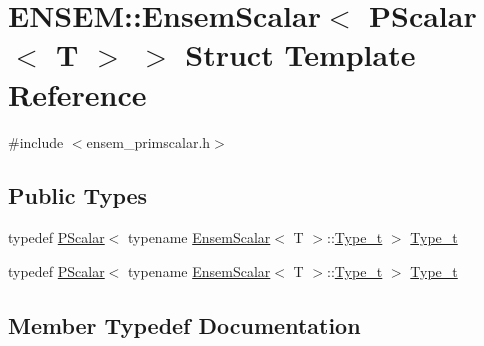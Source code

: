 \hypertarget{structENSEM_1_1EnsemScalar_3_01PScalar_3_01T_01_4_01_4}{}\section{E\+N\+S\+EM\+:\+:Ensem\+Scalar$<$ P\+Scalar$<$ T $>$ $>$ Struct Template Reference}
\label{structENSEM_1_1EnsemScalar_3_01PScalar_3_01T_01_4_01_4}


{\ttfamily \#include $<$ensem\+\_\+primscalar.\+h$>$}

\subsection*{Public Types}
\begin{DoxyCompactItemize}
\item 
typedef \mbox{\hyperlink{classENSEM_1_1PScalar}{P\+Scalar}}$<$ typename \mbox{\hyperlink{structENSEM_1_1EnsemScalar}{Ensem\+Scalar}}$<$ T $>$\+::\mbox{\hyperlink{structENSEM_1_1EnsemScalar_3_01PScalar_3_01T_01_4_01_4_a6f38dbaec74e64f56351f84b5d2c8c0c}{Type\+\_\+t}} $>$ \mbox{\hyperlink{structENSEM_1_1EnsemScalar_3_01PScalar_3_01T_01_4_01_4_a6f38dbaec74e64f56351f84b5d2c8c0c}{Type\+\_\+t}}
\item 
typedef \mbox{\hyperlink{classENSEM_1_1PScalar}{P\+Scalar}}$<$ typename \mbox{\hyperlink{structENSEM_1_1EnsemScalar}{Ensem\+Scalar}}$<$ T $>$\+::\mbox{\hyperlink{structENSEM_1_1EnsemScalar_3_01PScalar_3_01T_01_4_01_4_a6f38dbaec74e64f56351f84b5d2c8c0c}{Type\+\_\+t}} $>$ \mbox{\hyperlink{structENSEM_1_1EnsemScalar_3_01PScalar_3_01T_01_4_01_4_a6f38dbaec74e64f56351f84b5d2c8c0c}{Type\+\_\+t}}
\end{DoxyCompactItemize}


\subsection{Member Typedef Documentation}
\mbox{\label{structENSEM_1_1EnsemScalar_3_01PScalar_3_01T_01_4_01_4_a6f38dbaec74e64f56351f84b5d2c8c0c}} 
